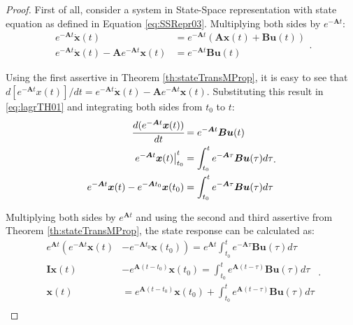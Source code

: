 \documentclass[a4paper,11pt]{book}
\numberwithin{figure}{chapter}
\numberwithin{equation}{chapter}
\numberwithin{table}{chapter}
\theoremstyle{definition}
\begin{document}
\begin{proof}
    First of all, consider a system in State-Space representation with state equation as defined in Equation \eqref{eq:SSRepr03}. Multiplying both sides by $e^{-\bm{A} t}$:
    \begin{equation} \label{eq:lagrTH01}
    \begin{split}
        e^{-\bm{A} t} \dot{\bm{x}}(t) &= e^{-\bm{A} t} (\bm{A} \bm{x}(t) + \bm{B} \bm{u}(t)) \\
        e^{-\bm{A} t} \dot{\bm{x}}(t) - \bm{A}e^{-\bm{A} t} \bm{x}(t)  &=  e^{-\bm{A} t} \bm{B} \bm{u}(t)
    \end{split}
    .\end{equation}
    
    Using the first assertive in Theorem \ref{th:stateTransMProp}, it is easy to see that $d[e^{-\bm{A} t} x(t)]/dt = e^{-\bm{A} t} \dot{\bm{x}}(t) - \bm{A} e^{-\bm{A} t} \bm{x}(t)$. Substituting this result in \eqref{eq:lagrTH01} and integrating both sides from $t_0$ to $t$:
    \begin{equation} \label{eq:lagrTH02}
    \begin{split}
        \cfrac{d(e^{-\bm{A} t} \bm{x}(t))}{dt} &= e^{-\bm{A} t} \bm{B} \bm{u}(t) \\
        \left. e^{-\bm{A} t} \bm{x}(t) \right|^{t}_{t_0}  &= \int_{t_0}^{t} e^{-\bm{A} \tau} \bm{B} \bm{u}(\tau) d\tau \\
        e^{-\bm{A} t} \bm{x}(t) - e^{-\bm{A} t_0} \bm{x}(t_0)  &= \int_{t_0}^{t} e^{-\bm{A} \tau} \bm{B} \bm{u}(\tau) d\tau
    \end{split}
    .\end{equation}
    
    Multiplying both sides by $e^{\bm{A} t}$ and using the second and third assertive from Theorem \ref{th:stateTransMProp}, the state response can be calculated as:
    \begin{equation} \label{eq:lagrTH03}
    \begin{split}
        e^{\bm{A} t} \left( e^{-\bm{A} t} \bm{x}(t) \right. &- \left. e^{-\bm{A} t_0} \bm{x}(t_0) \right) = e^{\bm{A} t} \int_{t_0}^{t} e^{-\bm{A} \tau} \bm{B} \bm{u}(\tau) d\tau \\
        \bm{I} \bm{x}(t) &- e^{\bm{A} (t - t_0)} \bm{x}(t_0) = \int_{t_0}^{t} e^{\bm{A}(t - \tau)} \bm{B} \bm{u}(\tau) d\tau \\
        \bm{x}(t) &= e^{\bm{A} (t - t_0)} \bm{x}(t_0) + \int_{t_0}^{t} e^{\bm{A}(t - \tau)} \bm{B} \bm{u}(\tau) d\tau \\
    \end{split}
    .\end{equation}
    

\end{proof}
\end{document}
